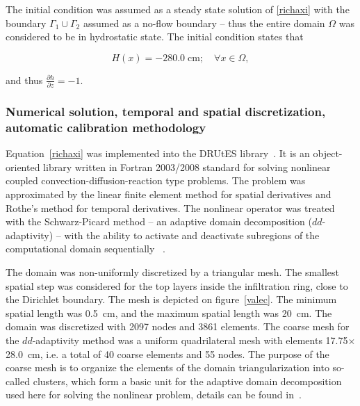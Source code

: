 \documentclass[review,times,3p,twocolumn,10pt]{elsarticle}
\newenvironment{lineq}
    {\begin{linenomath*}
    \begin{equation}
    }
    { 
    \end{equation} 
    \end{linenomath*}
    }
\begin{document}
The initial condition was assumed as a steady state  solution  of \eqref{richaxi} with the boundary $\Gamma_1 \cup \Gamma_2$ assumed as a no-flow boundary -- thus the entire domain $\Omega$ was considered to be in hydrostatic state. The initial condition states that 
\begin{lineq}
H(x) = -280.0 \; \mbox{cm}; \quad \forall x \in \Omega,
\end{lineq}
and thus $\frac{\partial h}{\partial z} = -1$.


\subsubsection{Numerical solution, temporal and spatial discretization, automatic calibration methodology}%
\label{trapoty}

Equation~\eqref{richaxi} was implemented into the DRUtES library~\citep{drutes}. It is an object-oriented library written in Fortran 2003/2008 standard for solving nonlinear coupled convection-diffusion-reaction type problems. The problem was approximated by the linear finite element method for spatial derivatives and Rothe's method for temporal derivatives. The nonlinear operator was treated with the Schwarz-Picard method -- an adaptive domain decomposition  ($dd$-adaptivity) -- with the ability to activate and deactivate subregions of the computational domain sequentially ~\citep{mojecomp, mojejcam2, mojeamc2}.



 The domain was non-uniformly discretized by a triangular mesh. The smallest spatial step was considered for the top layers inside the infiltration ring, close to the Dirichlet boundary. The mesh is depicted on figure~\ref{valec}. The minimum spatial length was 0.5~cm, and the maximum spatial length was 20~cm. The domain was discretized with 2097 nodes and 3861 elements. The coarse mesh for the $dd$-adaptivity method was a uniform quadrilateral mesh with elements 17.75$\times$28.0~cm, i.e. a total of 40 coarse elements and 55 nodes. The purpose of the coarse mesh is to organize the elements of the domain triangularization into so-called clusters, which form a basic unit for the adaptive domain decomposition used here for solving the nonlinear problem, details can be found in~\citep{mojeamc2}.
\end{document}
